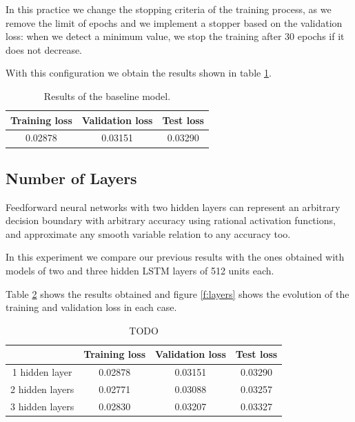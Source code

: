 \documentclass[]{article}
\begin{document}
In this practice we change the stopping criteria of the training process, as we remove the limit of epochs and we implement a stopper based on the validation loss: when we detect a minimum value, we stop the training after 30 epochs if it does not decrease.

With this configuration we obtain the results shown in table \ref{t:baseline}.

\begin{table}[H]
	\centering
	\begin{tabular}{@{}ccc@{}}
		\toprule
		Training loss & Validation loss & Test loss \\ \midrule
		0.02878       & 0.03151         & 0.03290   \\ \bottomrule
	\end{tabular}
	\caption{Results of the baseline model.}
	\label{t:baseline}
\end{table}

\subsection{Number of Layers}


Feedforward neural networks with two hidden layers can represent an arbitrary decision boundary with arbitrary accuracy using rational activation functions, and approximate any smooth variable relation to any accuracy too.

In this experiment we compare our previous results with the ones obtained with models of two and three hidden LSTM layers of 512 units each.

Table \ref{t:layers} shows the results obtained and figure \ref{f:layers} shows the evolution of the training and validation loss in each case.

\begin{table}[H]
	\centering
	\begin{tabular}{@{}cccc@{}}
		\toprule
		& Training loss & Validation loss & Test loss \\ \midrule
		1 hidden layer  & 0.02878       & 0.03151         & 0.03290   \\
		2 hidden layers & 0.02771       & 0.03088         & 0.03257   \\
		3 hidden layers & 0.02830       & 0.03207         & 0.03327   \\ \bottomrule
	\end{tabular}
	\caption{TODO}
	\label{t:layers}
\end{table}
\end{document}
